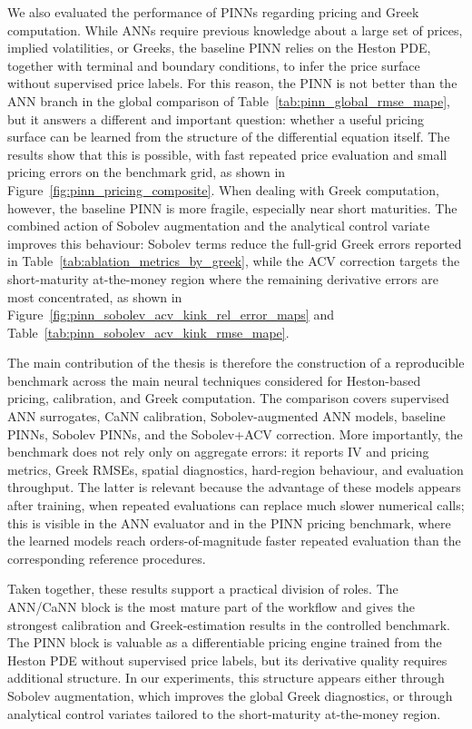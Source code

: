 We also evaluated the performance of PINNs regarding pricing and Greek computation. While ANNs require previous knowledge about a large set of prices, implied volatilities, or Greeks, the baseline PINN relies on the Heston PDE, together with terminal and boundary conditions, to infer the price surface without supervised price labels. For this reason, the PINN is not better than the ANN branch in the global comparison of Table~\ref{tab:pinn_global_rmse_mape}, but it answers a different and important question: whether a useful pricing surface can be learned from the structure of the differential equation itself. The results show that this is possible, with fast repeated price evaluation and small pricing errors on the benchmark grid, as shown in Figure~\ref{fig:pinn_pricing_composite}. When dealing with Greek computation, however, the baseline PINN is more fragile, especially near short maturities. The combined action of Sobolev augmentation and the analytical control variate improves this behaviour: Sobolev terms reduce the full-grid Greek errors reported in Table~\ref{tab:ablation_metrics_by_greek}, while the ACV correction targets the short-maturity at-the-money region where the remaining derivative errors are most concentrated, as shown in Figure~\ref{fig:pinn_sobolev_acv_kink_rel_error_maps} and Table~\ref{tab:pinn_sobolev_acv_kink_rmse_mape}.

The main contribution of the thesis is therefore the construction of a reproducible benchmark across the main neural techniques considered for Heston-based pricing, calibration, and Greek computation. The comparison covers supervised ANN surrogates, CaNN calibration, Sobolev-augmented ANN models, baseline PINNs, Sobolev PINNs, and the Sobolev+ACV correction. More importantly, the benchmark does not rely only on aggregate errors: it reports IV and pricing metrics, Greek RMSEs, spatial diagnostics, hard-region behaviour, and evaluation throughput. The latter is relevant because the advantage of these models appears after training, when repeated evaluations can replace much slower numerical calls; this is visible in the ANN evaluator and in the PINN pricing benchmark, where the learned models reach orders-of-magnitude faster repeated evaluation than the corresponding reference procedures.

Taken together, these results support a practical division of roles. The ANN/CaNN block is the most mature part of the workflow and gives the strongest calibration and Greek-estimation results in the controlled benchmark. The PINN block is valuable as a differentiable pricing engine trained from the Heston PDE without supervised price labels, but its derivative quality requires additional structure. In our experiments, this structure appears either through Sobolev augmentation, which improves the global Greek diagnostics, or through analytical control variates tailored to the short-maturity at-the-money region.


